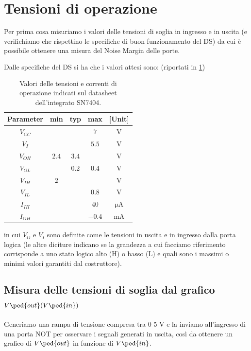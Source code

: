 \documentclass[10pt, a4paper, italian]{article}
\begin{document}
\section{Tensioni di operazione}\label{sec: tens}
Per prima cosa misuriamo i valori delle tensioni di soglia in ingresso e in
uscita (e verifichiamo che rispettino le specifiche di buon funzionamento del
DS) da cui è possibile ottenere una misura del Noise Margin delle porte.

Dalle specifiche del DS si ha che i valori attesi sono: (riportati in
\cref{tab: notDS})
\begin{table}[htb]
\centering
\begin{tabular}{cccc|c}
\toprule
Parameter  & min & typ & max & [Unit] \\
\midrule
\midrule
$V_{CC}$ &  &  & $7$ & V \\
$V_I$	 &  &  & $5.5$ & V\\
$V_{OH}$ & $2.4$  & $3.4$ & & V \\
$V_{OL}$ &   & $0.2$ & $0.4$ & V \\
$V_{IH}$ & $2$  &  & & V  \\
$V_{IL}$ &  &  & $0.8$ & V \\
$I_{IH}$ &  &  & $40$ & $\si{\micro\A}$ \\
$I_{OH}$ &  &  & $-0.4$ & mA \\
\bottomrule 
\end{tabular}
\caption{Valori delle tensioni e correnti di operazione indicati sul
datasheet dell'integrato SN7404.}
\label{tab: notDS}
\end{table}

in cui $V_O$ e $V_I$ sono definite come le tensioni in uscita e in ingresso
dalla porta logica (le altre diciture indicano se la grandezza a cui facciamo
riferimento corrisponde a uno stato logico alto (H) o basso (L) e quali sono
i massimi o minimi valori garantiti dal costruttore).

\subsection{Misura delle tensioni di soglia dal grafico
$V\ped{out}(V\ped{in})$}
Generiamo una rampa di tensione compresa tra 0-5 V e la inviamo
all'ingresso di una porta NOT per osservare i segnali generati in uscita,
così da ottenere un grafico di $V\ped{out}$ in funzione di $V\ped{in}$.
\end{document}

